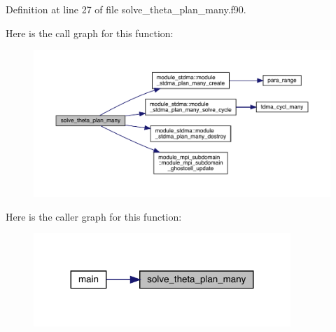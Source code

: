Definition at line 27 of file solve\+\_\+theta\+\_\+plan\+\_\+many.\+f90.

Here is the call graph for this function\+:\nopagebreak
\begin{figure}[H]
\begin{center}
\leavevmode
\includegraphics[width=350pt]{solve__theta__plan__many_8f90_af048018fcdfbe66e00922dee3e7e9a64_cgraph}
\end{center}
\end{figure}
Here is the caller graph for this function\+:\nopagebreak
\begin{figure}[H]
\begin{center}
\leavevmode
\includegraphics[width=275pt]{solve__theta__plan__many_8f90_af048018fcdfbe66e00922dee3e7e9a64_icgraph}
\end{center}
\end{figure}
